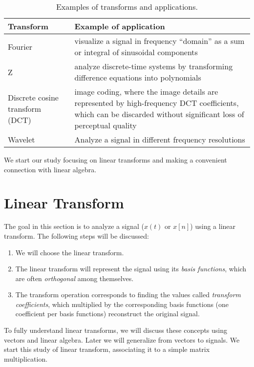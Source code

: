 \begin{table}
 \centering
 \caption{Examples of transforms and applications.\label{tab:transforms_examples}}
 \begin{tabularx}{\textwidth}{p{3cm}X}
 \toprule
 \textbf{Transform} & \textbf{Example of application} \\ \midrule
 Fourier & visualize a signal in frequency ``domain'' as a sum or integral of sinusoidal components \\
        Z &  analyze discrete-time systems by transforming difference equations into polynomials \\
        Discrete cosine  transform (DCT) & image coding, where the image details are represented
         by high-frequency DCT coefficients, which can be discarded without 
         significant loss of perceptual quality \\ 
				Wavelet & Analyze a signal in different frequency resolutions \\ \bottomrule
\end{tabularx}
\end{table}



We start our study focusing on linear transforms and making a convenient connection with linear algebra.

\section{Linear Transform}

The goal in this section is to analyze a signal ($x(t)$ or $x[n]$) using a linear transform. The following steps will be discussed:
\begin{enumerate}
	\item We will choose the linear transform.
	\item The linear transform will represent the signal using its \emph{basis functions}, which are often \emph{orthogonal} among themselves.
	\item The transform operation corresponds to finding the values called \emph{transform coefficients}, which multiplied by the corresponding
	basis functions (one coefficient per basis functions) reconstruct the original signal.
\end{enumerate}
To fully understand linear transforms, we will discuss these concepts using vectors and linear algebra. Later we will generalize from vectors to signals.
We start this study of linear transform, associating it to a simple matrix multiplication. 

